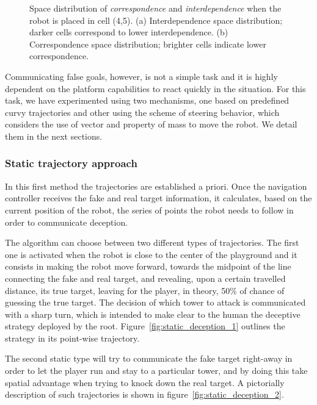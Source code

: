 \begin{figure}[H]
\begin{subfigure}[t]{0.49\columnwidth}
        \caption{}
        \label{fig:correspondence}
    \end{subfigure}
    \caption{Space distribution of \textit{correspondence} and \textit{interdependence} when the robot is placed in cell (4,5). (a) Interdependence space distribution; darker cells correspond to lower interdependence. (b) Correspondence space distribution; brighter cells indicate lower correspondence.}
    \label{fig::interdependece}
\end{figure}

Communicating false goals, however, is not a simple task and it is highly dependent on the platform capabilities to react quickly in the situation. For this task, we have experimented using two mechanisms, one based on predefined curvy trajectories and other using the scheme of steering behavior, which considers the use of vector and property of mass to move the robot. We detail them in the next sections.

\subsubsection{Static trajectory approach}
In this first method the trajectories are established a priori. Once the navigation controller receives the fake and real target information, it calculates, based on the current position of the robot, the series of points the robot needs to follow in order to communicate deception.

The algorithm can choose between two different types of trajectories. The first one is activated when the robot is close to the center of the playground and it consists in making the robot move forward, towards the midpoint of the line connecting the fake and real target, and revealing, upon a certain travelled distance, its true target, leaving for the player, in theory, 50\% of chance of guessing the true target. The decision of which tower to attack is communicated with a sharp turn, which is intended to make clear to the human the deceptive strategy deployed by the root. Figure~\ref{fig:static_deception_1} outlines the strategy in its point-wise trajectory.

The second static type will try to communicate the fake target right-away in order to let the player run and stay to a particular tower, and by doing this take spatial advantage when trying to knock down the real target. A pictorially description of such trajectories is shown in figure~\ref{fig:static_deception_2}.

